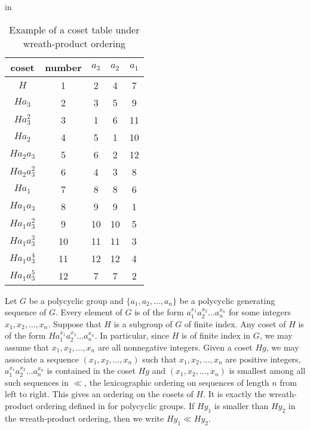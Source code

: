 \documentclass[12 pt]{article}
\begin{document}

\begin{table}
\centering
\caption{Example of a coset table under wreath-product ordering}
 in
\begin{tabular}{|c|c|c|c|c|}
\hline
coset & number & $a_3$ & $a_2$ & $a_1$\\
\hline
$H$ & 1 & 2 & 4 & 7 \\
$Ha_3$ & 2 & 3 & 5 & 9 \\
$Ha_3^2$ & 3 & 1 & 6 & 11 \\
$Ha_2$ & 4 & 5 & 1 & 10 \\
$Ha_2a_3$ & 5 & 6 & 2 & 12 \\
$Ha_2a_3^2$ & 6 & 4 & 3 & 8 \\
$Ha_1$ & 7 & 8 & 8 & 6 \\
$Ha_1a_3$ & 8 & 9 & 9 & 1 \\
$Ha_1a_3^2$ & 9 & 10 & 10 & 5 \\
$Ha_1a_3^3$ & 10 & 11 & 11 & 3 \\
$Ha_1a_3^4$ & 11 & 12 & 12 & 4 \\
$Ha_1a_3^5$ & 12 & 7 & 7 & 2 \\
\hline
\end{tabular}
\end{table}

Let $G$ be a polycyclic group and $\{a_1,a_2,\ldots,a_n\}$ be a
polycyclic generating sequence of $G$. Every element of $G$ is
of the form $a_1^{x_1}a_2^{x_2}\ldots a_n^{x_n}$ for some integers
$x_1,x_2,\ldots,x_n$.
Suppose that $H$ is a subgroup of $G$ of finite index. Any coset of
$H$ is of the form $Ha_1^{x_1}a_2^{x_2}\ldots a_n^{x_n}$. In particular,
since $H$ is of finite index in $G$, we may assume that $x_1,x_2,\ldots,
x_n$ are all nonnegative integers.
Given a coset $Hg$, we may associate
a sequence $(x_1,x_2,\ldots,x_n)$ such that
$x_1,x_2,\ldots,x_n$ are positive integers,
$a_1^{x_1}a_2^{x_2}\ldots
a_n^{x_n}$ is contained in the coset $Hg$ and
$(x_1,x_2,\ldots,x_n)$ is smallest among all such sequences
in $\ll$, the lexicographic ordering
on sequences of length $n$ from left to right.
This gives an ordering on the cosets of $H$.
It is exactly the wreath-product ordering defined
in \cite{Sims94} for polycyclic groups. If $Hy_1$ is smaller than
$Hy_2$ in the wreath-product ordering, then we write
$Hy_1\ll Hy_2$.
\end{document}
